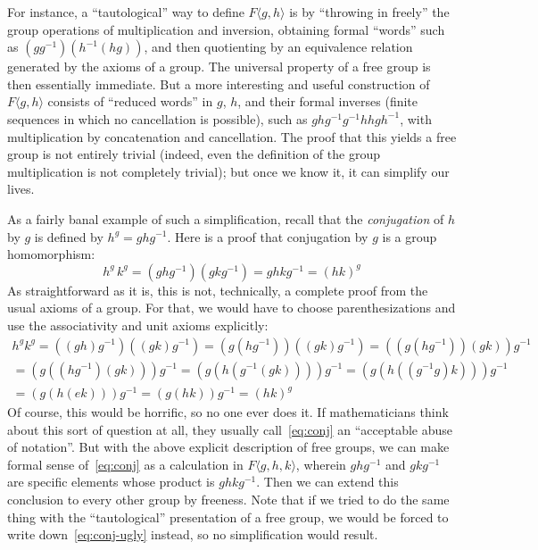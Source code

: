 \documentclass[10pt]{article}
\numberwithin{equation}{section}
\begin{document}
For instance, a ``tautological'' way to define $F\langle g,h\rangle$ is by ``throwing in freely'' the group operations of multiplication and inversion, obtaining formal ``words'' such as $(gg^{-1})(h^{-1}(h g))$, and then quotienting by an equivalence relation generated by the axioms of a group.
The universal property of a free group is then essentially immediate.
But a more interesting and useful construction of $F\langle g,h\rangle$ consists of ``reduced words'' in $g$, $h$, and their formal inverses (finite sequences in which no cancellation is possible), such as $g h g^{-1} g^{-1} h h g h^{-1}$, with multiplication by concatenation and cancellation.
The proof that this yields a free group is not entirely trivial (indeed, even the definition of the group multiplication is not completely trivial); but once we know it, it can simplify our lives.

As a fairly banal example of such a simplification, recall that the \emph{conjugation} of $h$ by $g$ is defined by $h^g = g h g^{-1}$.
Here is a proof that conjugation by $g$ is a group homomorphism:
\begin{equation}
  h^g\,k^g = (g h g^{-1})(g k g^{-1}) = g h k g^{-1} = (hk)^g\label{eq:conj}
\end{equation}
As straightforward as it is, this is not, technically, a complete proof from the usual axioms of a group.
For that, we would have to choose parenthesizations and use the associativity and unit axioms explicitly:
\begin{multline}\label{eq:conj-ugly}
  h^g k^g
  = ((g h) g^{-1})((g k) g^{-1})
  = (g (h g^{-1}))((g k) g^{-1})
  = ((g (h g^{-1}))(g k)) g^{-1}\\
  = (g ((h g^{-1})(g k))) g^{-1}
  = (g (h (g^{-1}(g k)))) g^{-1}
  = (g (h ((g^{-1} g) k))) g^{-1}\\
  = (g (h (e k))) g^{-1}
  = (g (h k)) g^{-1}
  = (h k)^g
\end{multline}
Of course, this would be horrific, so no one ever does it.
If mathematicians think about this sort of question at all, they usually call~\eqref{eq:conj} an ``acceptable abuse of notation''.
But with the above explicit description of free groups, we can make formal sense of~\eqref{eq:conj} as a calculation in $F\langle g,h,k\rangle$, wherein $g h g^{-1}$ and $g k g^{-1}$ are specific elements whose product is $g h k g^{-1}$.
Then we can extend this conclusion to every other group by freeness.
Note that if we tried to do the same thing with the ``tautological'' presentation of a free group, we would be forced to write down~\eqref{eq:conj-ugly} instead, so no simplification would result.
\end{document}

